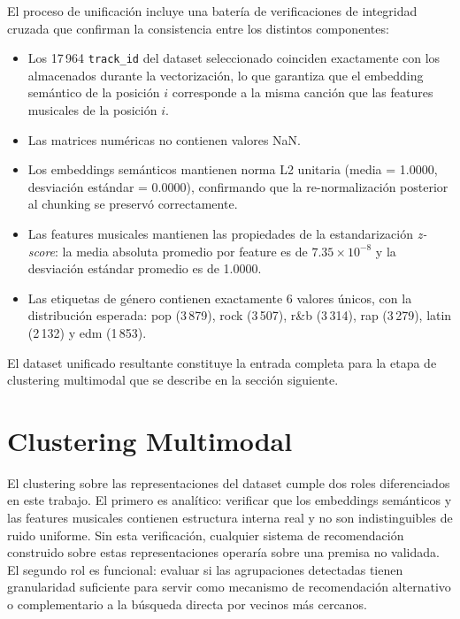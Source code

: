 El proceso de unificación incluye una batería de verificaciones de integridad cruzada que confirman la consistencia entre los distintos componentes:

\begin{itemize}[leftmargin=2em]
    \item Los 17\,964 \texttt{track\_id} del dataset seleccionado coinciden exactamente con los almacenados durante la vectorización, lo que garantiza que el embedding semántico de la posición $i$ corresponde a la misma canción que las features musicales de la posición $i$.

    \item Las matrices numéricas no contienen valores NaN.

    \item Los embeddings semánticos mantienen norma L2 unitaria (media = 1.0000, desviación estándar = 0.0000), confirmando que la re-normalización posterior al chunking se preservó correctamente.

    \item Las features musicales mantienen las propiedades de la estandarización \textit{z-score}: la media absoluta promedio por feature es de $7.35 \times 10^{-8}$ y la desviación estándar promedio es de 1.0000.

    \item Las etiquetas de género contienen exactamente 6 valores únicos, con la distribución esperada: pop (3\,879), rock (3\,507), r\&b (3\,314), rap (3\,279), latin (2\,132) y edm (1\,853).
\end{itemize}

El dataset unificado resultante constituye la entrada completa para la etapa de clustering multimodal que se describe en la sección siguiente.

\section{Clustering Multimodal}
\label{sec:clustering-multimodal}

El clustering sobre las representaciones del dataset cumple dos roles diferenciados en este trabajo. El primero es analítico: verificar que los embeddings semánticos y las features musicales contienen estructura interna real y no son indistinguibles de ruido uniforme. Sin esta verificación, cualquier sistema de recomendación construido sobre estas representaciones operaría sobre una premisa no validada. El segundo rol es funcional: evaluar si las agrupaciones detectadas tienen granularidad suficiente para servir como mecanismo de recomendación alternativo o complementario a la búsqueda directa por vecinos más cercanos.

